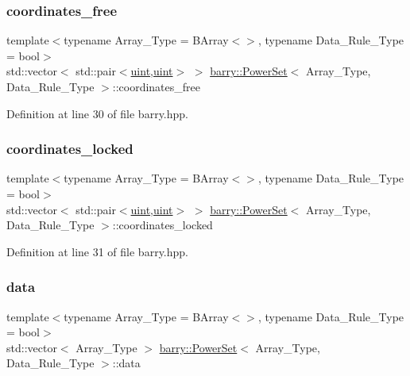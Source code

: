 \subsubsection{\texorpdfstring{coordinates\+\_\+free}{coordinates\_free}}
{\footnotesize\ttfamily template$<$typename Array\+\_\+\+Type  = B\+Array$<$$>$, typename Data\+\_\+\+Rule\+\_\+\+Type  = bool$>$ \\
std\+::vector$<$ std\+::pair$<$\hyperlink{namespacebarry_a11dfc53ddb4672278319aa04f1e09a6c}{uint},\hyperlink{namespacebarry_a11dfc53ddb4672278319aa04f1e09a6c}{uint}$>$ $>$ \hyperlink{classbarry_1_1_power_set}{barry\+::\+Power\+Set}$<$ Array\+\_\+\+Type, Data\+\_\+\+Rule\+\_\+\+Type $>$\+::coordinates\+\_\+free}



Definition at line 30 of file barry.\+hpp.

\mbox{\label{classbarry_1_1_power_set_a46fa867445a84be388ee62602922980a}} 
\subsubsection{\texorpdfstring{coordinates\+\_\+locked}{coordinates\_locked}}
{\footnotesize\ttfamily template$<$typename Array\+\_\+\+Type  = B\+Array$<$$>$, typename Data\+\_\+\+Rule\+\_\+\+Type  = bool$>$ \\
std\+::vector$<$ std\+::pair$<$\hyperlink{namespacebarry_a11dfc53ddb4672278319aa04f1e09a6c}{uint},\hyperlink{namespacebarry_a11dfc53ddb4672278319aa04f1e09a6c}{uint}$>$ $>$ \hyperlink{classbarry_1_1_power_set}{barry\+::\+Power\+Set}$<$ Array\+\_\+\+Type, Data\+\_\+\+Rule\+\_\+\+Type $>$\+::coordinates\+\_\+locked}



Definition at line 31 of file barry.\+hpp.

\mbox{\label{classbarry_1_1_power_set_a90fecd17a9d1f36153c07bc929b1630f}} 
\subsubsection{\texorpdfstring{data}{data}}
{\footnotesize\ttfamily template$<$typename Array\+\_\+\+Type  = B\+Array$<$$>$, typename Data\+\_\+\+Rule\+\_\+\+Type  = bool$>$ \\
std\+::vector$<$ Array\+\_\+\+Type $>$ \hyperlink{classbarry_1_1_power_set}{barry\+::\+Power\+Set}$<$ Array\+\_\+\+Type, Data\+\_\+\+Rule\+\_\+\+Type $>$\+::data}




